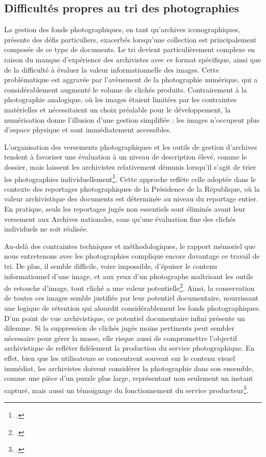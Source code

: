 \subsection*{Difficultés propres au tri des photographies}

La gestion des fonds photographiques, en tant qu'archives iconographiques, présente des défis particuliers, exacerbés lorsqu'une collection est principalement composée de ce type de documents. Le tri devient particulièrement complexe en raison du manque d'expérience des archivistes avec ce format spécifique, ainsi que de la difficulté à évaluer la valeur informationnelle des images. Cette problématique est aggravée par l'avènement de la photographie numérique, qui a considérablement augmenté le volume de clichés produits. Contrairement à la photographie analogique, où les images étaient limitées par les contraintes matérielles et nécessitaient un choix préalable pour le développement, la numérisation donne l'illusion d'une gestion simplifiée : les images n'occupent plus d'espace physique et sont immédiatement accessibles.

L’organisation des versements photographiques et les outils de gestion d’archives tendent à favoriser une évaluation à un niveau de description élevé, comme le dossier, mais laissent les archivistes relativement démunis lorsqu'il s'agit de trier les photographies individuellement\footcite[p.49]{charbonneauGestionArchivesPhotographiques2001}. Cette approche reflète celle adoptée dans le contexte des reportages photographiques de la Présidence de la République, où la valeur archivistique des documents est déterminée au niveau du reportage entier. En pratique, seuls les reportages jugés non essentiels sont éliminés avant leur versement aux Archives nationales, sans qu'une évaluation fine des clichés individuels ne soit réalisée.

Au-delà des contraintes techniques et méthodologiques, le rapport mémoriel que nous entretenons avec les photographies complique encore davantage ce travail de tri. De plus, il semble difficile, voire impossible, d'épuiser le contenu informationnel d'une image, et aux yeux d'un photographe maîtrisant les outils de retouche d'image, tout cliché a une valeur potentielle\footcite[p.12]{bergheindexation}. Ainsi, la conservation de toutes ces images semble justifiée par leur potentiel documentaire, nourrissant une logique de rétention qui alourdit considérablement les fonds photographiques. D’un point de vue archivistique, ce potentiel documentaire infini présente un dilemme. Si la suppression de clichés jugés moins pertinents peut sembler nécessaire pour gérer la masse, elle risque aussi de compromettre l'objectif archivistique de refléter fidèlement la production du service photographique. En effet, bien que les utilisateurs se concentrent souvent sur le contenu visuel immédiat, les archivistes doivent considérer la photographie dans son ensemble, comme une pièce d’un puzzle plus large, représentant non seulement un instant capturé, mais aussi un témoignage du fonctionnement du service producteur\footcite[p.101]{charbonneauGestionArchivesPhotographiques2001}.

